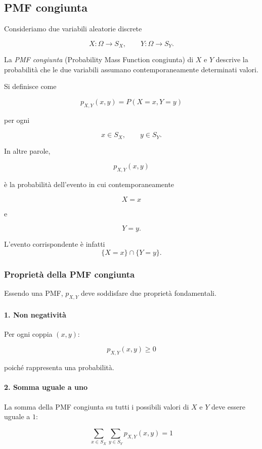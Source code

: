 \subsection{PMF congiunta}

Consideriamo due variabili aleatorie discrete

$$
X:\Omega\to S_X,
\qquad
Y:\Omega\to S_Y.
$$

La \emph{PMF congiunta} (Probability Mass Function congiunta) di $X$ e $Y$ descrive la probabilità che le due variabili assumano contemporaneamente determinati valori.

Si definisce come

$$
\boxed{
p_{X,Y}(x,y)
=
P(X=x,Y=y)
}
$$

per ogni

$$
x\in S_X,\qquad y\in S_Y.
$$

In altre parole,

$$
p_{X,Y}(x,y)
$$

è la probabilità dell'evento in cui contemporaneamente

$$
X=x
$$

e

$$
Y=y.
$$

L'evento corrispondente è infatti
$$
\{X=x\}\cap\{Y=y\}.
$$

\subsubsection{Proprietà della PMF congiunta}

Essendo una PMF, $p_{X,Y}$ deve soddisfare due proprietà fondamentali.

\paragraph{1. Non negatività}

Per ogni coppia $(x,y)$:

$$
\boxed{
p_{X,Y}(x,y)\geq 0
}
$$

poiché rappresenta una probabilità.

\paragraph{2. Somma uguale a uno}

La somma della PMF congiunta su tutti i possibili valori di $X$ e $Y$ deve essere uguale a $1$:

$$
\boxed{
\sum_{x\in S_X}\sum_{y\in S_Y}
p_{X,Y}(x,y)=1
}
$$


